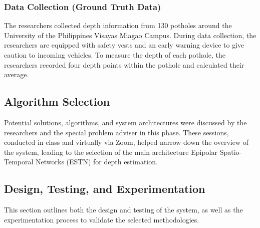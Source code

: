 \subsubsection{Data Collection (Ground Truth Data)}
The researchers collected depth information from 130 potholes around the University of the Philippines Visayas Miagao Campus. During data collection, the researchers are equipped with safety vests and an early warning device to give caution to incoming vehicles. To measure the depth of each pothole, the researchers recorded four depth points within the pothole and calculated their average.

\subsection{Algorithm Selection} 
Potential solutions, algorithms, and system architectures were discussed by the researchers and the special problem adviser in this phase. These sessions, conducted in class and virtually via Zoom, helped narrow down the overview of the system, leading to the selection of the main architecture Epipolar Spatio-Temporal Networks (ESTN) for depth estimation. 



\subsection{Design, Testing, and Experimentation}
This section outlines both the design and testing of the system, as well as the experimentation process to validate the selected methodologies. 

